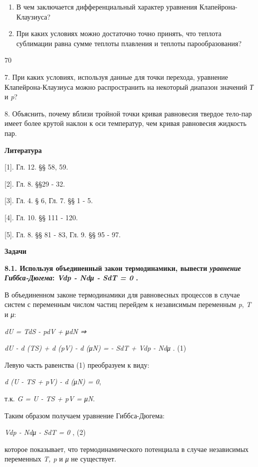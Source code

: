 \begin{enumerate}
\def\labelenumi{\arabic{enumi}.}
\setcounter{enumi}{3}
\item
  В чем заключается дифференциальный характер уравнения
  Клапейрона-Клаузиуса?
\item
  При каких условиях можно достаточно точно принять, что теплота
  сублимации равна сумме теплоты плавления и теплоты парообразования?
\end{enumerate}

70

7. При каких условиях, используя данные для точки перехода, уравнение
Клапейрона-Клаузиуса можно распространить на некоторый диапазон значений
\emph{Т} и \emph{p}?

8. Объяснить, почему вблизи тройной точки кривая равновесия твердое
тело-пар имеет более крутой наклон к оси температур, чем кривая
равновесия жидкость пар.

\textbf{Литература}

{[}1{]}. Гл. 12. §§ 58, 59.

{[}2{]}. Гл. 8. §§29 - 32.

{[}3{]}. Гл. 4. § 6, Гл. 7. §§ 1 - 5.

{[}4{]}. Гл. 10. §§ 111 - 120.

{[}5{]}. Гл. 8. §§ 81 - 83, Гл. 9. §§ 95 - 97.

\textbf{Задачи}

\textbf{8.1. Используя объединенный закон термодинамики, вывести
\emph{уравнение Гиббса-Дюгема}: \emph{Vdp - Ndμ - SdT = 0} .}

\solving{}

В объединенном законе термодинамики для равновесных процессов в случае
систем с переменным числом частиц перейдем к независимым переменным
\emph{p}, \emph{T} и \emph{μ}:

\emph{dU = TdS - pdV + μdN ⇒}

\emph{dU - d (TS) + d (pV) - d (μN) = - SdT + Vdp - Ndμ} . (1)

Левую часть равенства (1) преобразуем к виду:

\emph{d (U - TS + pV) - d (μN) = 0},

т.к. \emph{G = U - TS + pV = μN}.

Таким образом получаем уравнение Гиббса-Дюгема:

\emph{Vdp - Ndμ - SdT = 0} , (2)

которое показывает, что термодинамического потенциала в случае
независимых переменных \emph{T, p} и \emph{μ} не существует.

